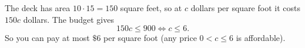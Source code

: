 The deck has area $10\cdot15=150$ square feet, so at $c$ dollars per square foot it costs $150c$ dollars. The budget gives
\[
150c\le900\iff c\le6 .
\]
So you can pay at most $\boxed{\$6}$ per square foot (any price $0<c\le6$ is affordable).
